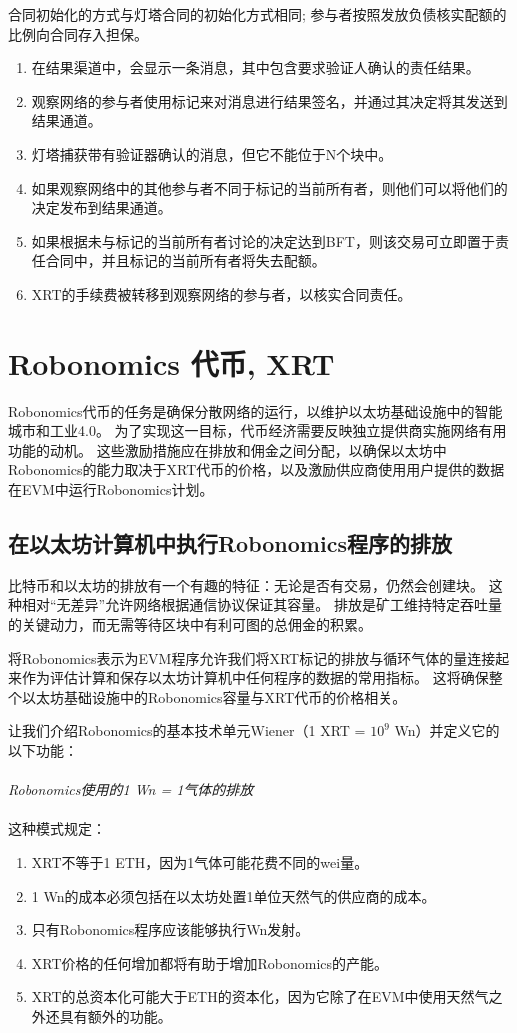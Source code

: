 \documentclass[UTF8]{article}
\begin{document}
合同初始化的方式与灯塔合同的初始化方式相同; 参与者按照发放负债核实配额的比例向合同存入担保。
\begin{enumerate}
	\item 在结果渠道中，会显示一条消息，其中包含要求验证人确认的责任结果。
	\item 观察网络的参与者使用标记来对消息进行结果签名，并通过其决定将其发送到结果通道。
	\item 灯塔捕获带有验证器确认的消息，但它不能位于N个块中。
	\item 如果观察网络中的其他参与者不同于标记的当前所有者，则他们可以将他们的决定发布到结果通道。
	\item 如果根据未与标记的当前所有者讨论的决定达到BFT，则该交易可立即置于责任合同中，并且标记的当前所有者将失去配额。
	\item XRT的手续费被转移到观察网络的参与者，以核实合同责任。
\end{enumerate}

\section{Robonomics 代币, XRT}

Robonomics代币的任务是确保分散网络的运行，以维护以太坊基础设施中的智能城市和工业4.0。 为了实现这一目标，代币经济需要反映独立提供商实施网络有用功能的动机。 这些激励措施应在排放和佣金之间分配，以确保以太坊中Robonomics的能力取决于XRT代币的价格，以及激励供应商使用用户提供的数据在EVM中运行Robonomics计划。

\subsection{在以太坊计算机中执行Robonomics程序的排放}

比特币和以太坊的排放有一个有趣的特征：无论是否有交易，仍然会创建块。 这种相对“无差异”允许网络根据通信协议保证其容量。 排放是矿工维持特定吞吐量的关键动力，而无需等待区块中有利可图的总佣金的积累。
 
将Robonomics表示为EVM程序允许我们将XRT标记的排放与循环气体的量连接起来作为评估计算和保存以太坊计算机中任何程序的数据的常用指标。 这将确保整个以太坊基础设施中的Robonomics容量与XRT代币的价格相关。

让我们介绍Robonomics的基本技术单元Wiener（1 XRT = $10^9$ Wn）并定义它的以下功能： 
\\
\\
\textit{Robonomics使用的1 Wn = 1气体的排放}
\\
\\
这种模式规定：
\begin{enumerate}
	\item XRT不等于1 ETH，因为1气体可能花费不同的wei量。
	\item 1 Wn的成本必须包括在以太坊处置1单位天然气的供应商的成本。
	\item 只有Robonomics程序应该能够执行Wn发射。
	\item XRT价格的任何增加都将有助于增加Robonomics的产能。
	\item XRT的总资本化可能大于ETH的资本化，因为它除了在EVM中使用天然气之外还具有额外的功能。
\end{enumerate}
\end{document}
